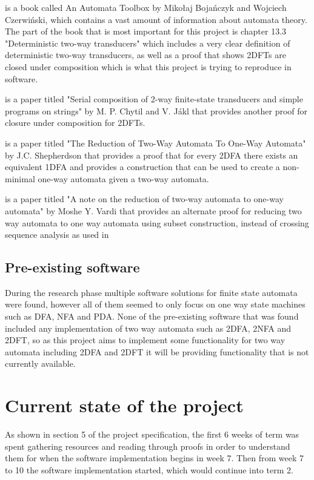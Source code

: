\documentclass[12pt, a4paper]{article}
\begin{document}
\cite{toolbox} is a book called An Automata Toolbox by Mikołaj Bojańczyk and Wojciech Czerwiński, which contains a vast amount of information about automata theory. The part of the book that is most important for this project is chapter 13.3 "Deterministic two-way transducers" which includes a very clear definition of deterministic two-way transducers, as well as a proof that shows 2DFTs are closed under composition which is what this project is trying to reproduce in software.

\cite{chytil} is a paper titled "Serial composition of 2-way finite-state transducers and simple programs on strings" by M. P. Chytil and V. J{\'a}kl that provides another proof for closure under composition for 2DFTs.

\cite{2-1} is a paper titled "The Reduction of Two-Way Automata To One-Way Automata" by J.C. Shepherdson that provides a proof that for every 2DFA there exists an equivalent 1DFA and provides a construction that can be used to create a non-minimal one-way automata given a two-way automata.

\cite{note} is a paper titled "A note on the reduction of two-way automata to one-way automata" by Moshe Y. Vardi that provides an alternate proof for reducing two way automata to one way automata using subset construction, instead of crossing sequence analysis as used in \cite{2-1}

\subsection{Pre-existing software}
During the research phase multiple software solutions for finite state automata were found, however all of them seemed to only focus on one way state machines such as DFA, NFA and PDA. None of the pre-existing software that was found included any implementation of two way automata such as 2DFA, 2NFA and 2DFT, so as this project aims to implement some functionality for two way automata including 2DFA and 2DFT it will be providing functionality that is not currently available.
\pagebreak
\section{Current state of the project}
As shown in section 5 of the project specification, the first 6 weeks of term was spent gathering resources and reading through proofs in order to understand them for when the software implementation begins in week 7. Then from week 7 to 10 the software implementation started, which would continue into term 2.
\end{document}
